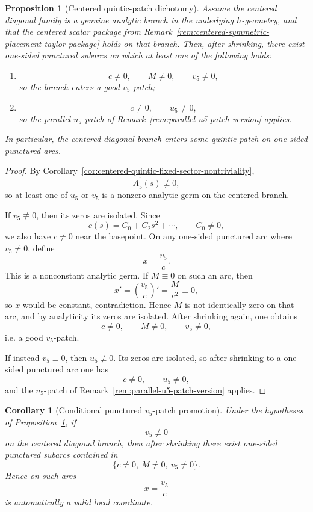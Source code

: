 \documentclass[11pt,a4paper]{amsart}
\theoremstyle{plain}
\newtheorem{proposition}[theorem]{Proposition}
\newtheorem{corollary}[theorem]{Corollary}
\theoremstyle{definition}
\begin{document}
\begin{proposition}[Centered quintic-patch dichotomy]
\label{prop:centered-quintic-patch-dichotomy}
Assume the centered diagonal family is a genuine analytic branch in the
underlying $h$-geometry, and that the centered scalar package from
Remark~\ref{rem:centered-symmetric-placement-taylor-package} holds on that
branch. Then, after shrinking, there exist one-sided punctured subarcs on which
at least one of the following holds:
\begin{enumerate}
\item
\[
c\neq 0,\qquad M\neq 0,\qquad v_5\neq 0,
\]
so the branch enters a good $v_5$-patch;
\item
\[
c\neq 0,\qquad u_5\neq 0,
\]
so the parallel $u_5$-patch of
Remark~\ref{rem:parallel-u5-patch-version} applies.
\end{enumerate}
In particular, the centered diagonal branch enters some quintic patch on
one-sided punctured arcs.
\end{proposition}

\begin{proof}
By Corollary~\ref{cor:centered-quintic-fixed-sector-nontriviality},
\[
A_5^{\mathfrak f}(s)\not\equiv 0,
\]
so at least one of $u_5$ or $v_5$ is a nonzero analytic germ on the centered
branch.

If $v_5\not\equiv 0$, then its zeros are isolated. Since
\[
c(s)=C_0+C_2s^2+\cdots,\qquad C_0\neq 0,
\]
we also have $c\neq 0$ near the basepoint. On any one-sided punctured arc
where $v_5\neq 0$, define
\[
x=\frac{v_5}{c}.
\]
This is a nonconstant analytic germ. If $M\equiv 0$ on such an arc, then
\[
x'=\left(\frac{v_5}{c}\right)'=\frac{M}{c^2}\equiv 0,
\]
so $x$ would be constant, contradiction. Hence $M$ is not identically zero on
that arc, and by analyticity its zeros are isolated. After shrinking again, one
obtains
\[
c\neq 0,\qquad M\neq 0,\qquad v_5\neq 0,
\]
i.e. a good $v_5$-patch.

If instead $v_5\equiv 0$, then $u_5\not\equiv 0$. Its zeros are isolated, so
after shrinking to a one-sided punctured arc one has
\[
c\neq 0,\qquad u_5\neq 0,
\]
and the $u_5$-patch of Remark~\ref{rem:parallel-u5-patch-version} applies.
\end{proof}

\begin{corollary}[Conditional punctured $v_5$-patch promotion]
\label{cor:conditional-punctured-v5-patch-promotion}
Under the hypotheses of
Proposition~\ref{prop:centered-quintic-patch-dichotomy}, if
\[
v_5\not\equiv 0
\]
on the centered diagonal branch, then after shrinking there exist one-sided
punctured subarcs contained in
\[
\{c\neq 0,\ M\neq 0,\ v_5\neq 0\}.
\]
Hence on such arcs
\[
x=\frac{v_5}{c}
\]
is automatically a valid local coordinate.
\end{corollary}
\end{document}

